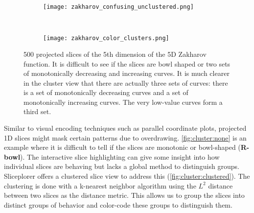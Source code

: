 \begin{figure}
  \centering
  \begin{subfigure}[b]{0.48\columnwidth}
    \texttt{[image: zakharov\_confusing\_unclustered.png]}
    \caption{
    }
    \label{fig:cluster:none}
  \end{subfigure}
  ~
  \begin{subfigure}[b]{0.48\columnwidth}
    \texttt{[image: zakharov\_color\_clusters.png]}
    \caption{
    }
    \label{fig:cluster:clustered}
  \end{subfigure}
  \caption[500 projected slices of the 5th dimension of the 5D Zakharov~\cite{Back:1996} function.]{%
    500 projected slices of the 5th dimension of the 5D Zakharov~\cite{Back:1996} 
    function. It is difficult to see if the slices are bowl shaped or two sets
    of monotonically decreasing and increasing curves. It is much clearer in 
    the cluster view that there are actually three sets of curves: 
    there is a set of monotonically decreasing curves and a set of 
    monotonically increasing curves. The very low-value curves form a third
    set.
  }
\end{figure}

Similar to visual encoding techniques such as parallel coordinate plots, projected 1D slices might mask certain patterns due to
overdrawing.
\autoref{fig:cluster:none} is an example where it is difficult to tell if the
slices are monotonic or bowl-shaped (\textbf{R-bowl}). The interactive slice highlighting
can give some insight into how individual slices are behaving but lacks
a global method to distinguish groups. Sliceplorer offers a
clustered slice view to address this (\autoref{fig:cluster:clustered}). 
The clustering is done with a k-nearest neighbor algorithm using the
$L^2$ distance between two slices as the distance metric.
This allows us to group the slices into distinct
groups of behavior and color-code these groups to distinguish them.

